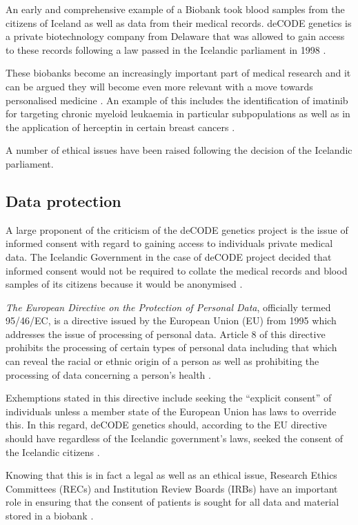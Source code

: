 \documentclass[british,a4paper, 12pt]{article}
\begin{document}
An early and comprehensive example of a Biobank took blood samples from the
citizens of Iceland as well as data from their medical records. deCODE
genetics is a private biotechnology company from Delaware that was allowed to
gain access to these records following a law passed in the Icelandic parliament
in 1998 \parencite{chadwick1999icelandic}.

These biobanks become an increasingly important part of medical research and 
it can be argued they will become even more relevant with a move towards 
personalised medicine \parencite{watson2010integrating}. An example of this
includes the identification of imatinib for targeting chronic myeloid leukaemia 
in particular subpopulations \parencite{cohen2002approval} as well as in the
application of herceptin in certain breast cancers \parencite{lemieux2009role}.

A number of ethical issues have been raised following the decision of the Icelandic parliament.

\subsection{Data protection}
A large proponent of the criticism of the deCODE genetics project is the issue
of informed consent with regard to gaining access to individuals private
medical data. The Icelandic Government in the case of deCODE project decided that informed
consent would not be required to collate the medical records and blood samples 
of its citizens because it would be anonymised \parencite{chadwick1999icelandic}.

\emph{The European Directive on the Protection of Personal Data}, officially 
termed 95/46/EC, is a directive issued by the European Union (EU) from 1995 which 
addresses the issue of processing of personal data. Article 8 of this directive 
prohibits the processing of certain types of personal data including that which
can reveal the racial or ethnic origin of a person as well as prohibiting the 
processing of data concerning a person's health \parencite{directive199595}.

Exhemptions stated in this directive include seeking the ``explicit consent'' 
of individuals unless a member state of the European Union has laws to override 
this. In this regard, deCODE genetics should, according to the EU directive 
should have regardless of the Icelandic government's laws, seeked the consent of 
the Icelandic citizens \parencite{carey2009data}.

Knowing that this is in fact a legal as well as an ethical issue, Research Ethics 
Committees (RECs) and Institution Review Boards (IRBs) have an important role in 
ensuring that the consent of patients is sought for all data and material stored in a
biobank \parencite{watson2010integrating}.
\end{document}
